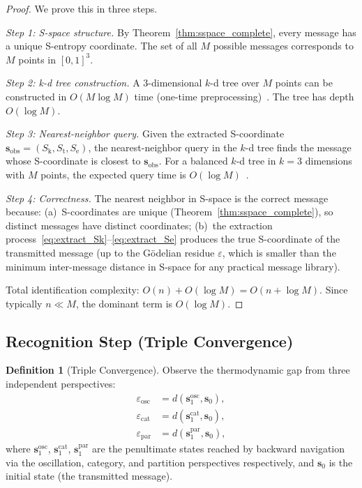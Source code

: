 \documentclass[11pt,twocolumn,a4paper]{article}
\theoremstyle{definition}
\newtheorem{definition}[theorem]{Definition}
\newcommand{\Sk}{S_{\mathrm{k}}}
\newcommand{\St}{S_{\mathrm{t}}}
\newcommand{\Se}{S_{\mathrm{e}}}
\newcommand{\eps}{\varepsilon}
\begin{document}
\begin{proof}
We prove this in three steps.

\emph{Step 1: S-space structure.}
By Theorem~\ref{thm:sspace_complete}, every message has a unique S-entropy coordinate.
The set of all $M$ possible messages corresponds to $M$ points in $[0,1]^3$.

\emph{Step 2: k-d tree construction.}
A 3-dimensional $k$-d tree over $M$ points can be constructed in
$O(M \log M)$ time (one-time preprocessing)~\cite{bentley1975}. The tree has depth
$O(\log M)$.

\emph{Step 3: Nearest-neighbor query.}
Given the extracted S-coordinate $\mathbf{s}_{\mathrm{obs}} = (\Sk, \St, \Se)$, the
nearest-neighbor query in the $k$-d tree finds the message whose S-coordinate is closest
to $\mathbf{s}_{\mathrm{obs}}$. For a balanced $k$-d tree in $k = 3$ dimensions with
$M$ points, the expected query time is $O(\log M)$~\cite{bentley1975}.

\emph{Step 4: Correctness.}
The nearest neighbor in S-space is the correct message because:
(a)~S-coordinates are unique (Theorem~\ref{thm:sspace_complete}), so distinct messages
have distinct coordinates;
(b)~the extraction process~\eqref{eq:extract_Sk}--\eqref{eq:extract_Se} produces the
true S-coordinate of the transmitted message (up to the G\"odelian residue $\eps$,
which is smaller than the minimum inter-message distance in S-space for any practical
message library).

Total identification complexity: $O(n) + O(\log M) = O(n + \log M)$. Since typically
$n \ll M$, the dominant term is $O(\log M)$.
\end{proof}

\subsection{Recognition Step (Triple Convergence)}\label{sec:backward:recognition}

\begin{definition}[Triple Convergence]\label{def:triple_convergence}
Observe the thermodynamic gap from three independent perspectives:
\begin{align}
  \eps_{\mathrm{osc}} &= d(\mathbf{s}_1^{\mathrm{osc}}, \mathbf{s}_0), \label{eq:eps_osc} \\
  \eps_{\mathrm{cat}} &= d(\mathbf{s}_1^{\mathrm{cat}}, \mathbf{s}_0), \label{eq:eps_cat} \\
  \eps_{\mathrm{par}} &= d(\mathbf{s}_1^{\mathrm{par}}, \mathbf{s}_0), \label{eq:eps_par}
\end{align}
where $\mathbf{s}_1^{\mathrm{osc}}$, $\mathbf{s}_1^{\mathrm{cat}}$,
$\mathbf{s}_1^{\mathrm{par}}$ are the penultimate states reached by backward navigation
via the oscillation, category, and partition perspectives respectively, and $\mathbf{s}_0$
is the initial state (the transmitted message).
\end{definition}
\end{document}
